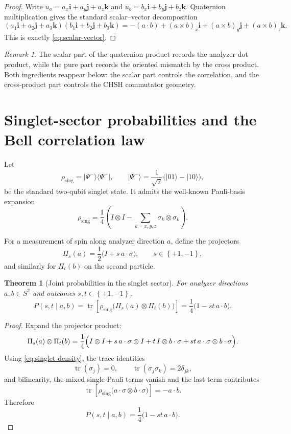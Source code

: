 \documentclass[11pt]{article}
\newtheorem{theorem}[definition]{Theorem}
\theoremstyle{remark}
\newtheorem{remark}[definition]{Remark}
\newcommand{\ii}{\mathbf{i}}
\newcommand{\jj}{\mathbf{j}}
\newcommand{\kk}{\mathbf{k}}
\newcommand{\Id}{I}
\newcommand{\tr}{\operatorname{tr}}
\newcommand{\set}[1]{\left\{ #1 \right\}}
\newcommand{\ket}[1]{\lvert #1 \rangle}
\newcommand{\bra}[1]{\langle #1 \rvert}
\begin{document}
\begin{proof}
Write $u_a = a_x \ii + a_y \jj + a_z \kk$ and $u_b = b_x \ii + b_y \jj + b_z \kk$. Quaternion multiplication gives the standard scalar--vector decomposition
\[
(a_1\ii+a_2\jj+a_3\kk)(b_1\ii+b_2\jj+b_3\kk)
=
-(a\cdot b) + (a\times b)_x \ii + (a\times b)_y \jj + (a\times b)_z \kk.
\]
This is exactly \eqref{eq:scalar-vector}.
\end{proof}

\begin{remark}
The scalar part of the quaternion product records the analyzer dot product, while the pure part records the oriented mismatch by the cross product. Both ingredients reappear below: the scalar part controls the correlation, and the cross-product part controls the CHSH commutator geometry.
\end{remark}

\section{Singlet-sector probabilities and the Bell correlation law}

Let
\[
\rho_{\mathrm{sing}} = \ket{\Psi^-}\bra{\Psi^-},
\qquad
\ket{\Psi^-} = \frac{1}{\sqrt2}\bigl(\ket{01}-\ket{10}\bigr),
\]
be the standard two-qubit singlet state. It admits the well-known Pauli-basis expansion
\begin{equation}
\rho_{\mathrm{sing}}
=
\frac14
\left(
\Id\otimes\Id
-
\sum_{k=x,y,z}\sigma_k\otimes\sigma_k
\right).
\label{eq:singlet-density}
\end{equation}

For a measurement of spin along analyzer direction $a$, define the projectors
\begin{equation}
\Pi_s(a) = \frac12\bigl(\Id + s\, a\cdot \sigma\bigr),
\qquad s\in\set{+1,-1},
\label{eq:projectors}
\end{equation}
and similarly for $\Pi_t(b)$ on the second particle.

\begin{theorem}[Joint probabilities in the singlet sector]
For analyzer directions $a,b\in S^2$ and outcomes $s,t\in\set{+1,-1}$,
\begin{equation}
P(s,t\mid a,b)
=
\tr\!\left[\rho_{\mathrm{sing}}\bigl(\Pi_s(a)\otimes \Pi_t(b)\bigr)\right]
=
\frac14\bigl(1-st\,a\cdot b\bigr).
\label{eq:joint-prob}
\end{equation}
\end{theorem}

\begin{proof}
Expand the projector product:
\[
\Pi_s(a)\otimes \Pi_t(b)
=
\frac14\Bigl(
\Id\otimes\Id
+
s\,a\cdot\sigma\otimes\Id
+
t\,\Id\otimes b\cdot\sigma
+
st\,a\cdot\sigma\otimes b\cdot\sigma
\Bigr).
\]
Using \eqref{eq:singlet-density}, the trace identities
\[
\tr(\sigma_j)=0,
\qquad
\tr(\sigma_j\sigma_k)=2\delta_{jk},
\]
and bilinearity, the mixed single-Pauli terms vanish and the last term contributes
\[
\tr\!\left[
\rho_{\mathrm{sing}}
\bigl(a\cdot\sigma\otimes b\cdot\sigma\bigr)
\right]
=
-a\cdot b.
\]
Therefore
\[
P(s,t\mid a,b)
=
\frac14\bigl(1-st\,a\cdot b\bigr).
\]
\end{proof}
\end{document}
